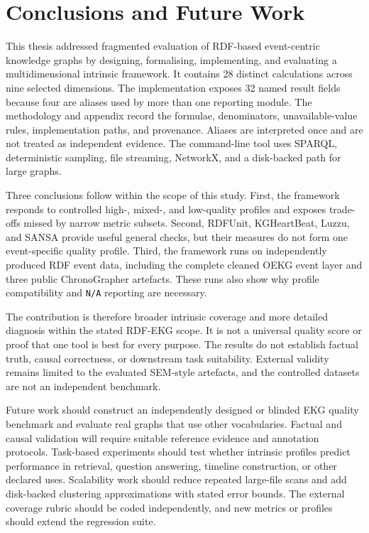 \chapter{Conclusions and Future Work}
\enlargethispage{\baselineskip}

This thesis addressed fragmented evaluation of RDF-based event-centric knowledge graphs by designing, formalising, implementing, and evaluating a multidimensional intrinsic framework. It contains 28 distinct calculations across nine selected dimensions. The implementation exposes 32 named result fields because four are aliases used by more than one reporting module. The methodology and appendix record the formulae, denominators, unavailable-value rules, implementation paths, and provenance. Aliases are interpreted once and are not treated as independent evidence. The command-line tool uses SPARQL, deterministic sampling, file streaming, NetworkX, and a disk-backed path for large graphs.

Three conclusions follow within the scope of this study. First, the framework responds to controlled high-, mixed-, and low-quality profiles and exposes trade-offs missed by narrow metric subsets. Second, RDFUnit, KGHeartBeat, Luzzu, and SANSA provide useful general checks, but their measures do not form one event-specific quality profile. Third, the framework runs on independently produced RDF event data, including the complete cleaned OEKG event layer and three public ChronoGrapher artefacts. These runs also show why profile compatibility and \texttt{N/A} reporting are necessary.

The contribution is therefore broader intrinsic coverage and more detailed diagnosis within the stated RDF-EKG scope. It is not a universal quality score or proof that one tool is best for every purpose. The results do not establish factual truth, causal correctness, or downstream task suitability. External validity remains limited to the evaluated SEM-style artefacts, and the controlled datasets are not an independent benchmark.

Future work should construct an independently designed or blinded EKG quality benchmark and evaluate real graphs that use other vocabularies. Factual and causal validation will require suitable reference evidence and annotation protocols. Task-based experiments should test whether intrinsic profiles predict performance in retrieval, question answering, timeline construction, or other declared uses. Scalability work should reduce repeated large-file scans and add disk-backed clustering approximations with stated error bounds. The external coverage rubric should be coded independently, and new metrics or profiles should extend the regression suite.
